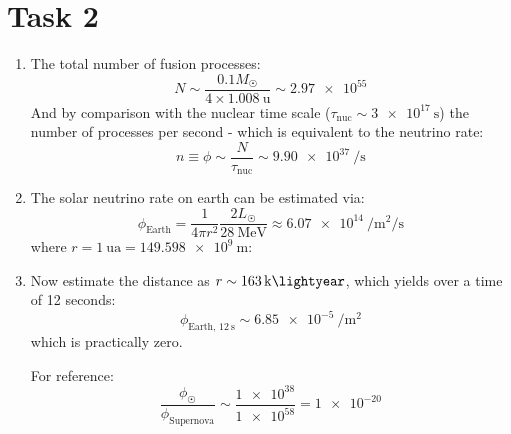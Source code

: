 \documentclass[11pt,a4paper]{scrartcl}
\newcommand{\Lsol}{\ensuremath{L_{\astrosun}}}
\newcommand{\Msol}{\ensuremath{M_{\astrosun}}}
\newcommand{\hmass}{\SI{1.008}{\atomicmassunit}}
\begin{document}
\section*{Task 2}

\begin{enumerate}[label=\textbf{\large(\alph*)}, itemsep=2\baselineskip]

\item
    The total number of fusion processes:
    \begin{equation*}
        N\sim\frac{0.1\Msol}{4\times\hmass}\sim\num{2.97e55}
    \end{equation*}
    And by comparison with the nuclear time scale
    ($\tau_{\mathrm{nuc}}\sim\SI{3e17}{\second}$) the number of processes per
    second - which is equivalent to the neutrino rate:
    \begin{equation*}
        n\equiv\phi\sim\frac{N}{\tau_{\mathrm{nuc}}}\sim\SI{9.90e37}{\per\second}
    \end{equation*}

\item
    The solar neutrino rate on earth can be estimated via:
    \begin{equation*}
        \phi_{\mathrm{Earth}}=\frac{1}{4\pi r^2}\frac{2\Lsol}{\SI{28}{\mega\electronvolt}}
        \approx\SI{6.07e14}{\per\metre\squared\per\second}
    \end{equation*}
    where $r=\SI{1}{\astronomicalunit}=\SI{149.598e9}{\metre}$:

\item
    Now estimate the distance as $r\sim\SI{163}{\kilo\lightyear}$, which
    yields over a time of 12 seconds:
    \begin{equation*}
        \phi_{\mathrm{Earth},\,\SI{12}{\second}}\sim\SI{6.85e-5}{\per\metre\squared}
    \end{equation*}
    which is practically zero.

    For reference:
    \begin{equation*}
        \frac{\phi_{\astrosun}}{\phi_{\mathrm{Supernova}}}\sim\frac{\num{1e38}}{\num{1e58}}=\num{1e-20}
    \end{equation*}

\end{enumerate}
\end{document}
